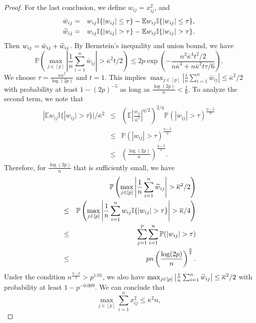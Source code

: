 \begin{proof}
For the last conclusion, we define $w_{ij}=x_{ij}^2$, and
\begin{eqnarray*}
\bar{w}_{ij} &=& w_{ij}\mathbb{I}\{|w_{ij}|\leq\tau\}-\mathbb{E}w_{ij}\mathbb{I}\{|w_{ij}|\leq\tau\}, \\
\wt{w}_{ij} &=& w_{ij}\mathbb{I}\{|w_{ij}|>\tau\}-\mathbb{E}w_{ij}\mathbb{I}\{|w_{ij}|>\tau\}.
\end{eqnarray*}
Then $w_{ij}=\bar{w}_{ij}+\widetilde{w}_{ij}$. By Bernstein's inequality and union bound, we have
$$\mathbb{P}\left(\max_{j\in[p]}\left|\frac{1}{n}\sum_{i=1}^n\bar{w}_{ij}\right|>\overline{\kappa}^2 t/2\right)\leq 2p\exp\left(-\frac{n^2\overline{\kappa}^4t^2/2}{n\overline{\kappa}^4+n\overline{\kappa}^2 t\tau/6}\right).$$
We choose $\tau=\frac{n\overline{\kappa}^2}{\log(2p)}$ and $t=1$. This implies $\max_{j\in[p]}\left|\frac{1}{n}\sum_{i=1}^n\bar{w}_{ij}\right|\leq \overline{\kappa}^2/2$ with probability at least $1-(2p)^{-5}$ as long as $\frac{\log(2p)}{n}<\frac{1}{6}$. To analyze the second term, we note that
\begin{eqnarray*}
|\mathbb{E}w_{ij}\mathbb{I}\{|w_{ij}|>\tau\}|/\overline{\kappa}^2 &\leq& \left(\mathbb{E}\left|\frac{w_{ij}}{\overline{\kappa}^2}\right|^{\eta/2}\right)^{2/\eta} \mathbb{P}\left(|w_{ij}|>\tau\right)^{\frac{\eta-2}{\eta}} \\
&\leq&  \mathbb{P}\left(|w_{ij}|>\tau\right)^{\frac{\eta-2}{\eta}} \\
&\leq& \left(\frac{\log (2p)}{n}\right)^{\frac{\eta-2}{2}}.
\end{eqnarray*}
Therefore, for $\frac{\log (2p)}{n}$ that is sufficiently small, we have
\begin{eqnarray*}
&& \mathbb{P}\left(\max_{j\in[p]}\left|\frac{1}{n}\sum_{i=1}^n\wt{w}_{ij}\right|>\overline{\kappa}^2/2\right) \\
&\leq& \mathbb{P}\left(\max_{j\in[p]}\left|\frac{1}{n}\sum_{i=1}^nw_{ij}\mathbb{I}\{|w_{ij}|>\tau\}\right|>\overline{\kappa}/4\right) \\
&\leq& \sum_{j=1}^p\sum_{i=1}^n\mathbb{P}(|w_{ij}|>\tau) \\
&\leq& pn \left(\frac{\log (2p)}{n}\right)^{\frac{\eta}{2}}.
\end{eqnarray*}
Under the condition $n^{\frac{\eta-2}{2}}>p^{1.01}$, we also have $\max_{j\in[p]}\left|\frac{1}{n}\sum_{i=1}^n\widetilde{w}_{ij}\right|\leq \overline{\kappa}^2/2$ with probability at least $1-p^{-0.009}$. We can conclude that
\begin{equation}
\max_{j\in[p]}\sum_{i=1}^nx_{ij}^2\leq \overline{\kappa}^2n,\label{eq:nice-x}

\end{equation}
\end{proof}
